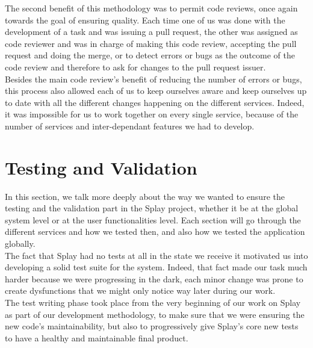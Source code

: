 \documentclass{eplmastersthesis}
\begin{document}
          The second benefit of this methodology was to
          permit code reviews, once again towards the goal of ensuring quality.
          Each time one of us was done with the development of a
          task and was issuing a pull request, the other was assigned as code
          reviewer and was in charge of making this code review, accepting the
          pull request and doing the merge, or to detect errors or bugs as the
          outcome of the code review and therefore to ask for changes to the
          pull request issuer.\\

          Besides the main code review's benefit of reducing the number of
          errors or bugs, this process also allowed each of us to keep ourselves
          aware and keep ourselves up to date with all the different changes
          happening on the different services. Indeed, it was impossible for
          us to work together on every single service, because
          of the number of services and inter-dependant features we had to
          develop.

    \section{Testing and Validation}

      In this section, we talk more deeply about the way we wanted to ensure
      the testing and the validation part in the Splay project, whether it be
      at the global system level or at the user functionalities level. Each
      section will go through the different services and how we tested then, and
      also how we tested the application globally.\\

      The fact that Splay had no tests at all in the state we receive it
      motivated us into developing a solid test suite for the system.
      Indeed, that fact made our task much harder because we were progressing
      in the dark, each minor change was prone to create dysfunctions that we
      might only notice way later during our work.\\

      The test writing phase took place from the very beginning of our work on
      Splay as part of our development methodology,
      to make sure that we were ensuring the new code's maintainability, but
      also to progressively give Splay's core new tests to have a healthy
      and maintainable final product.
\end{document}
